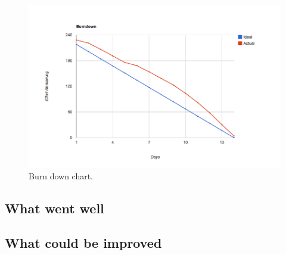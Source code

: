 \begin{figure}[H]
	\centering
		\includegraphics[width=18cm]{sprint5/BurndownSprint5.png}
	\caption{Burn down chart.}
	\label{fig:Burn5 }
\end{figure}

\subsection{What went well}
\subsection{What could be improved}
